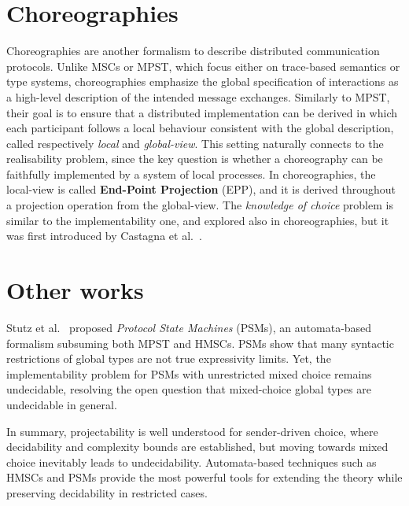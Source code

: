 \section{Choreographies}
Choreographies \cite{montesi2014choreographic} are another formalism to describe  
distributed communication protocols. Unlike MSCs or MPST, which focus either on 
trace-based semantics or type systems, choreographies emphasize the 
global specification of interactions as a high-level description of the 
intended message exchanges. Similarly to MPST, their goal is to ensure that
a distributed  implementation can be derived in which each participant 
follows a local behaviour consistent with the global description, called
respectively \emph{local} and \emph{global-view}. This setting naturally 
connects to the realisability problem, since the key question is whether 
a choreography can be faithfully implemented by a system of local 
processes. In choreographies, the local-view is called \textbf{End-Point Projection} (EPP),
and it is derived throughout a projection operation from the global-view.
The \emph{knowledge of choice} problem is similar to the implementability one,
and explored also in choreographies,
but it was first introduced by Castagna et al.~\cite{castagna2012global}.

\section{Other works}
Stutz et al.~\cite{stutz2025automata} proposed \emph{Protocol State Machines} 
(PSMs), an automata-based formalism subsuming both MPST and HMSCs. 
PSMs show that many syntactic restrictions of global types are not 
true expressivity limits. Yet, the implementability problem for PSMs 
with unrestricted mixed choice remains undecidable, resolving the 
open question that mixed-choice global types are undecidable in general.  

In summary, projectability is well understood for sender-driven choice, 
where decidability and complexity bounds are established, but moving 
towards mixed choice inevitably leads to undecidability. Automata-based 
techniques such as HMSCs and PSMs provide the most powerful tools for 
extending the theory while preserving decidability in restricted cases.